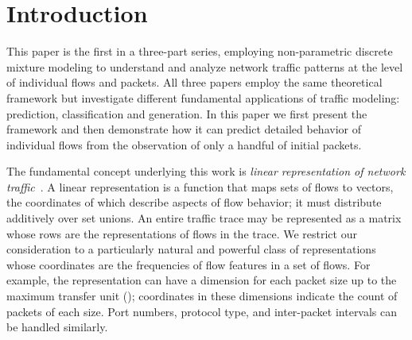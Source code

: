 \documentclass[conference]{IEEEtran}
\title{\vspace{-0.25em}\thetitle}
\author{
{\large{Stefan~Karpinski, John~R.~Gilbert, Elizabeth~M.~Belding}} \vspace{0.25em}\\
Department of Computer Science \\
University of California, Santa Barbara \vspace{0.35em}\\
\textit{\{sgk,gilbert,ebelding\}@cs.ucsb.edu}
}
\begin{document}
\maketitle

\section{Introduction}


This paper is the first in a three-part series, employing non-parametric discrete mixture modeling to understand and analyze network traffic patterns at the level of individual flows and packets.\flownote
All three papers employ the same theoretical framework but investigate different fundamental applications of traffic modeling:
prediction, classification and generation.
In this paper we first present the framework and then demonstrate how it can predict detailed behavior of individual flows from the observation of only a handful of initial packets.

The fundamental concept underlying this work is \emph{linear representation of network traffic}~\cite{Karpinski08}.
A linear representation is a function that maps sets of flows to vectors, the coordinates of which describe aspects of flow behavior;
it must distribute additively over set unions.
An entire traffic trace may be represented as a matrix whose rows are the representations of flows in the trace.
We restrict our consideration to a particularly natural and powerful class of representations whose coordinates are the frequencies of flow features in a set of flows.
For example, the representation can have a dimension for each packet size up to the maximum transfer unit ();
coordinates in these dimensions indicate the count of packets of each size.
Port numbers,  protocol type, and inter-packet intervals can be handled similarly.
\end{document}
